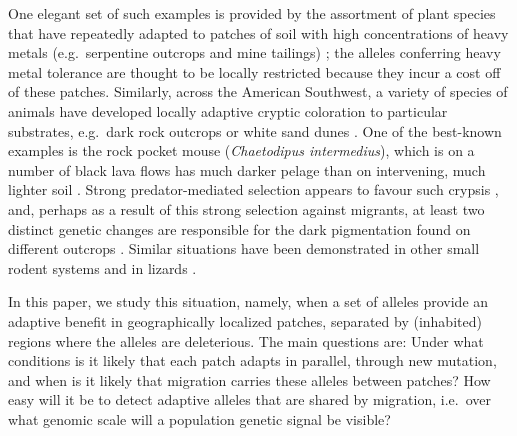 \documentclass{article}
\newcommand{\citep}[1]{\cite{#1}}
\begin{document}
One elegant set of such examples is provided by the assortment of plant species 
that have repeatedly adapted to patches of soil with high concentrations of heavy metals
(e.g.\ serpentine outcrops and mine tailings) \citep{kruckeberg1951intraspecific,turner2010serpentine,macnair1991evolution,schat1996identical};
the alleles conferring heavy metal tolerance are thought to be locally restricted 
because they incur a cost off of these patches.
Similarly, across the American Southwest, a variety of species of animals have developed locally adaptive cryptic coloration
to particular substrates, e.g.\ dark rock outcrops or white sand dunes
\citep{benson1933concealing}.
One of the best-known examples is the rock pocket mouse (\textit{Chaetodipus intermedius}),
which is on a number of black lava flows has much darker pelage than on intervening,
much lighter soil \citep{DiceBlossom1937}.
Strong predator-mediated selection appears to favour such crypsis \citep{kaufman1974adaptive},
and, perhaps as a result of this strong selection against migrants, 
at least two distinct genetic changes are responsible for the dark pigmentation found on different outcrops \citep{hoekstra2003different}. 
Similar situations have been demonstrated in other small rodent systems \citep{steiner2009genetic,kingsley2009melanism,dice1940ecologic}
and in lizards \citep{rosenblum2010molecular}.

In this paper, we study this situation, namely,
when a set of alleles provide an adaptive benefit in geographically localized patches, 
separated by (inhabited) regions where the alleles are deleterious.
The main questions are:
Under what conditions is it likely that each patch adapts in parallel, through new mutation,
and when is it likely that migration carries these alleles between patches?
How easy will it be to detect adaptive alleles that are shared by
migration, i.e.\ over what genomic scale will a population genetic
signal be visible?
\end{document}
